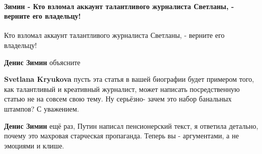  
 
 
 
 
\paragraph{Зимин - Кто взломал аккаунт талантливого журналиста Светланы, - верните его владельцу!}

\begin{itemize}
 
Кто взломал аккаунт талантливого журналиста Светланы, - верните его владельцу!


 
\textbf{Денис Зимин} объясните

 
\textbf{Svetlana Kryukova} пусть эта статья в вашей биографии будет примером того, как талантливый и креативный журналист, может написать посредственную статью не на совсем свою тему. Ну серьёзно- зачем это набор банальных штампов? С уважением.


 
\textbf{Денис Зимин} ещё раз, Путин написал пенсионерский текст, я ответила детально, почему это махровая старческая пропаганда. Теперь вы - аргументами, а не эмоциями и клише.


\end{itemize}
